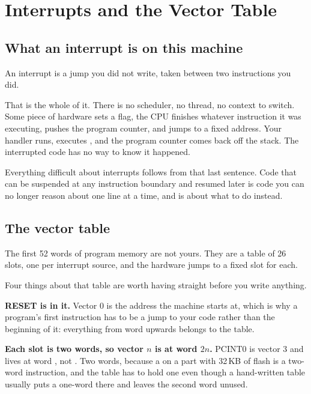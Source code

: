 
\section{Interrupts and the Vector Table}
\label{c3:sec:interrupts}

\subsection{What an interrupt is on this machine}
\label{c3:sec:what}
An interrupt is a jump you did not write, taken between two instructions you did.

That is the whole of it. There is no scheduler, no thread, no context to switch. Some piece of
hardware sets a flag, the CPU finishes whatever instruction it was executing, pushes the program
counter, and jumps to a fixed address. Your handler runs, executes , and the program
counter comes back off the stack. The interrupted code has no way to know it happened.

Everything difficult about interrupts follows from that last sentence. Code that can be suspended
at any instruction boundary and resumed later is code you can no longer reason about one line at a
time, and  is about what to do instead.

\subsection{The vector table}
\label{c3:sec:table}
The first 52 words of program memory are not yours. They are a table of 26 slots, one per
interrupt source, and the hardware jumps to a fixed slot for each.


Four things about that table are worth having straight before you write anything.

\textbf{RESET is in it.} Vector 0 is the address the machine starts at, which is why a program's
first instruction has to be a jump to your code rather than the beginning of it: everything from
word  upwards belongs to the table.

\textbf{Each slot is two words, so vector $n$ is at word $2n$.} PCINT0 is vector 3 and lives at
word , not . Two words, because a  on a part with 32\,KB of
flash is a two-word instruction, and the table has to hold one even though a hand-written table
usually puts a one-word  there and leaves the second word unused.

